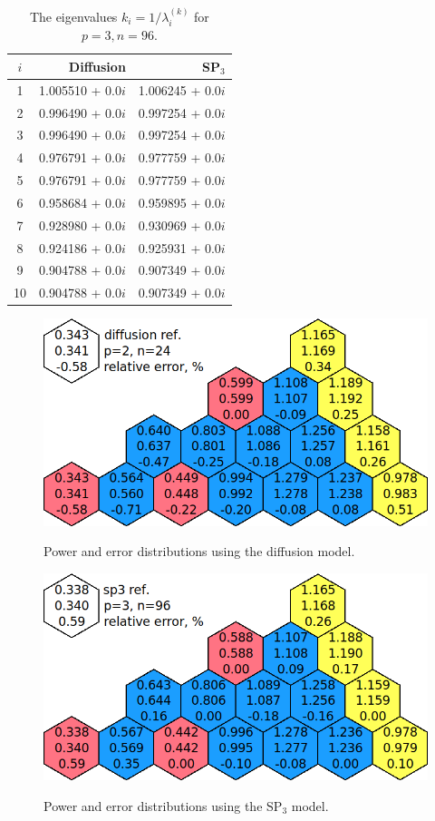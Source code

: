 \documentclass[authoryear]{elsarticle}
\begin{document}
\begin{table}[h]
\caption{The eigenvalues $k_i=1/\lambda_i^{(k)}$ for $p=3, n=96$.}
\label{tab:iaea_with_lambda_10}
\begin{center}
\begin{tabular}{c r r}
\hline
$i$ & Diffusion & SP$_3$  \\
\hline
1 & 1.005510 + 0.0$i$   & 1.006245 + 0.0$i$\\
2 & 0.996490 + 0.0$i$ & 0.997254 + 0.0$i$\\
3 & 0.996490 + 0.0$i$ & 0.997254 + 0.0$i$\\
4 & 0.976791 + 0.0$i$ & 0.977759 + 0.0$i$\\
5 & 0.976791 + 0.0$i$ & 0.977759 + 0.0$i$\\
6 & 0.958684 + 0.0$i$ & 0.959895 + 0.0$i$\\
7 & 0.928980 + 0.0$i$ & 0.930969 + 0.0$i$\\
8 & 0.924186 + 0.0$i$ & 0.925931 + 0.0$i$\\
9 & 0.904788 + 0.0$i$ & 0.907349 + 0.0$i$\\
10 & 0.904788 + 0.0$i$ & 0.907349 + 0.0$i$\\
\hline
\end{tabular}
\end{center}
\end{table}

\begin{figure}[H]
\begin{center}
	\includegraphics[width=0.75\linewidth]{diff_p2n24.png}\\
	\caption{Power and error distributions using the diffusion model.}
	\label{fig:power_iaea_with_dif}
\end{center}
\end{figure}
\begin{figure}[H]
\begin{center}
	\includegraphics[width=0.75\linewidth]{sp3_p3n96.png}\\
	\caption{Power and error distributions using the $\mathrm{SP_3}$ model.}
	\label{fig:power_iaea_with_sp3}
\end{center}
\end{figure}
\end{document}
